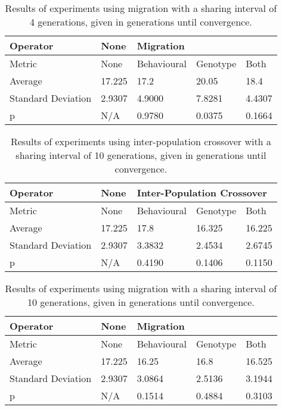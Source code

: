 \documentclass[12pt]{article} %
\begin{document}
\begin{table} \centering
    \begin{tabular}{|l|l|l|l|l|}
    \hline
    Operator			& None	& \multicolumn{3}{l|}{Migration} \\ \hline
    Metric			& None	& Behavioural	& Genotype	& Both  \\ \hline
    Average			& 17.225	& 17.2			& 20.05	& 18.4 \\ \hline
    Standard Deviation	& 2.9307	& 4.9000		& 7.8281	& 4.4307  \\ \hline
    p 				& N/A 		& 0.9780		& 0.0375	& 0.1664  \\ \hline
    \end{tabular}
    \caption{Results of experiments using migration with a sharing interval of 4 generations, given in generations until convergence.}
\end{table}

\begin{table} \centering
    \begin{tabular}{|l|l|l|l|l|}
    \hline
    Operator			& None	& \multicolumn{3}{l|}{Inter-Population Crossover} \\ \hline
    Metric			& None	& Behavioural	& Genotype	& Both  \\ \hline
    Average			& 17.225	& 17.8			& 16.325	& 16.225 \\ \hline
    Standard Deviation	& 2.9307	& 3.3832		& 2.4534	& 2.6745 \\ \hline
    p 				& N/A 		& 0.4190		& 0.1406	& 0.1150  \\ \hline
    \end{tabular}
    \caption{Results of experiments using inter-population crossover with a sharing interval of 10 generations, given in generations until convergence.}
\end{table}

\begin{table} \centering
    \begin{tabular}{|l|l|l|l|l|}
    \hline
    Operator			& None	& \multicolumn{3}{l|}{Migration} \\ \hline
    Metric			& None	& Behavioural	& Genotype	& Both  \\ \hline
    Average			& 17.225	& 16.25		& 16.8	& 16.525 \\ \hline
    Standard Deviation	& 2.9307	& 3.0864		& 2.5136	& 3.1944  \\ \hline
    p 				& N/A 		& 0.1514		& 0.4884	& 0.3103  \\ \hline
    \end{tabular}
    \caption{Results of experiments using migration with a sharing interval of 10 generations, given in generations until convergence.}
\end{table}
\end{document}
